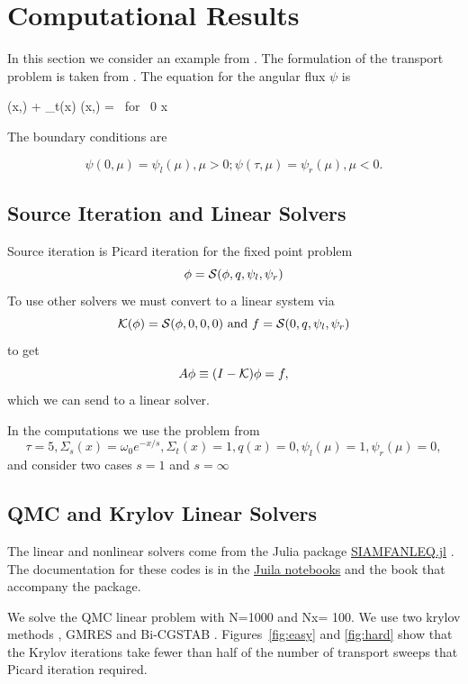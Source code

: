 \section{Computational Results}
\label{sec:results}
In this section we consider an example from
\cite{cesinh}. The formulation of the transport
problem is taken from \cite{ctk:jeff1}. The equation for the angular
flux \(\psi\) is

\begeq
\label{eq:transportgs}
\mu {} (x,\mu) + \Sigma_t(x) \psi(x,\mu) =
 
 \mbox{ for } 0 \le x \le \tau
\endeq

The boundary conditions are

\[
\psi(0, \mu) = \psi_l(\mu), \mu > 0; \psi(\tau, \mu) = \psi_r(\mu),
\mu < 0.
\]

\subsection{Source Iteration and Linear Solvers}
\label{subsec:source}

Source iteration is Picard iteration for the fixed point problem
\[
\phi = {\cal S}(\phi, q, \psi_l, \psi_r)
\]
To use other solvers we must convert to a linear system via
\[
{\cal K}(\phi) = {\cal S}(\phi, 0, 0, 0) \mbox{ and }
f = {\cal S}(0, q, \psi_l, \psi_r)
\]
to get
\[
A \phi \equiv (I - {\cal K}) \phi = f,
\]
which we can send to a linear solver.

In the computations we use the problem from \cite{cesinh}
\[
\tau=5, \Sigma_s(x) =\omega_0 e^{-x/s},  \Sigma_t(x) = 1, q(x) = 0, \psi_l(\mu) = 1, \psi_r(\mu) = 0,
\]
and consider two cases $s=1$ and $s=\infty$ 

\clearpage

\subsection{QMC and Krylov Linear Solvers}
\label{subsec:krylov}


The linear and nonlinear solvers come from the Julia package
\href{https://github.com/ctkelley/SIAMFANLEquations.jl}{SIAMFANLEQ.jl}
\cite{ctk:siamfanl}. The documentation for these codes is in the
\href{https://github.com/ctkelley/NotebookSIAMFANL}{Juila notebooks}
\cite{ctk:notebooknl} and the book \cite{ctk:fajulia}
that accompany the package. 


We solve the QMC linear problem with N=1000 and Nx= 100. 
We use two krylov methods \cite{ctk:roots}, GMRES \cite{gmres} and
Bi-CGSTAB \cite{bicgstab}.  Figures~\ref{fig:easy} and 
\ref{fig:hard} show that
the Krylov iterations take fewer than half of the number
of transport sweeps that Picard iteration required.

